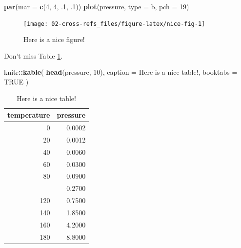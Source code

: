 \documentclass[
]{book}
\newenvironment{Shaded}{\begin{snugshade}}{\end{snugshade}}
\newcommand{\AttributeTok}[1]{\textcolor[rgb]{0.13,0.29,0.53}{#1}}
\newcommand{\ConstantTok}[1]{\textcolor[rgb]{0.56,0.35,0.01}{#1}}
\newcommand{\DecValTok}[1]{\textcolor[rgb]{0.00,0.00,0.81}{#1}}
\newcommand{\FunctionTok}[1]{\textcolor[rgb]{0.13,0.29,0.53}{\textbf{#1}}}
\newcommand{\NormalTok}[1]{#1}
\newcommand{\SpecialCharTok}[1]{\textcolor[rgb]{0.81,0.36,0.00}{\textbf{#1}}}
\newcommand{\StringTok}[1]{\textcolor[rgb]{0.31,0.60,0.02}{#1}}
\theoremstyle{definition}
\theoremstyle{definition}
\theoremstyle{definition}
\theoremstyle{definition}
\theoremstyle{remark}
\begin{document}
\begin{Shaded}
\begin{Highlighting}[]
\FunctionTok{par}\NormalTok{(}\AttributeTok{mar =} \FunctionTok{c}\NormalTok{(}\DecValTok{4}\NormalTok{, }\DecValTok{4}\NormalTok{, .}\DecValTok{1}\NormalTok{, .}\DecValTok{1}\NormalTok{))}
\FunctionTok{plot}\NormalTok{(pressure, }\AttributeTok{type =} \StringTok{\textquotesingle{}b\textquotesingle{}}\NormalTok{, }\AttributeTok{pch =} \DecValTok{19}\NormalTok{)}
\end{Highlighting}
\end{Shaded}

\begin{figure}

{\centering \texttt{[image: 02-cross-refs\_files/figure-latex/nice-fig-1]} 

}

\caption{Here is a nice figure!}\label{fig:nice-fig}
\end{figure}

Don't miss Table \ref{tab:nice-tab}.

\begin{Shaded}
\begin{Highlighting}[]
\NormalTok{knitr}\SpecialCharTok{::}\FunctionTok{kable}\NormalTok{(}
  \FunctionTok{head}\NormalTok{(pressure, }\DecValTok{10}\NormalTok{), }\AttributeTok{caption =} \StringTok{\textquotesingle{}Here is a nice table!\textquotesingle{}}\NormalTok{,}
  \AttributeTok{booktabs =} \ConstantTok{TRUE}
\NormalTok{)}
\end{Highlighting}
\end{Shaded}

\begin{table}

\caption{\label{tab:nice-tab}Here is a nice table!}
\centering
\begin{tabular}[t]{rr}
\toprule
temperature & pressure\\
\midrule
0 & 0.0002\\
20 & 0.0012\\
40 & 0.0060\\
60 & 0.0300\\
80 & 0.0900\\
\addlinespace
100 & 0.2700\\
120 & 0.7500\\
140 & 1.8500\\
160 & 4.2000\\
180 & 8.8000\\
\bottomrule
\end{tabular}
\end{table}
\end{document}
